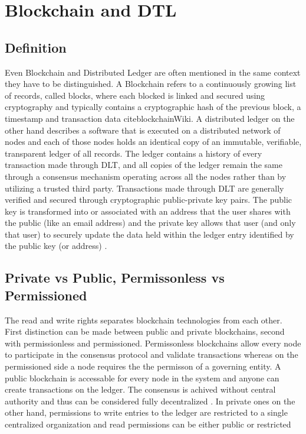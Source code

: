 \section{Blockchain and DTL}
\subsection{Definition}
Even Blockchain and Distributed Ledger are often mentioned in the same context they have to be distinguished. 
A Blockchain refers to a continuously growing list of records, called blocks, where each blocked is linked and secured using cryptography and typically contains a cryptographic hash of the previous block, a timestamp and transaction data cite{blockchainWiki}. 
A distributed ledger on the other hand describes a software that is executed on a distributed network of nodes and each of those nodes holds an identical copy of an immutable, verifiable, transparent ledger of all records. The ledger contains a history of every transaction made through DLT, and all copies of the ledger remain the same through a consensus mechanism operating across all the nodes rather than by utilizing a trusted third party. Transactions made through DLT are generally verified and secured through cryptographic public-private key pairs. The public key is transformed into or associated with an address that the user shares with the public (like an email address) and the private key allows that user (and only that user) to securely update the data held within the ledger entry identified by the public key (or address) \cite{dlt}. 

\subsection{Private vs Public, Permissonless vs Permissioned}

The read and write rights separates blockchain technologies from each other.
First distinction can be made between public and private blockchains, second with permissionless and permissioned.
Permissonless blockchains allow every node to participate in the consensus protocol and validate transactions whereas on the permissioned side a node requires the the permisson of a governing entity.\cite{dtl}
A public blockchain is accessable for every node in the system and anyone can create transactions on the ledger. The consensus is achived without central authority and thus can be considered fully decentralized \cite{publicBlockchain}. In private ones on the other hand, permissions to write entries to the ledger are restricted to a single centralized organization and read permissions can be either public or restricted\cite{dlt}


